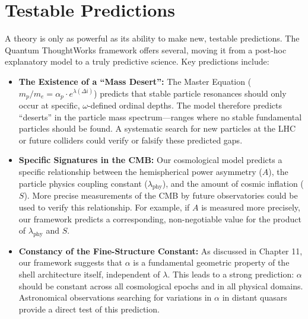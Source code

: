 \documentclass[12pt]{report}
\begin{document}
\section{Testable Predictions}
A theory is only as powerful as its ability to make new, testable predictions. The Quantum ThoughtWorks framework offers several, moving it from a post-hoc explanatory model to a truly predictive science. Key predictions include:
\begin{itemize}
    \item \textbf{The Existence of a ``Mass Desert'':} The Master Equation ($m_p/m_e = \alpha_p \cdot e^{\lambda (\Delta i)}$) predicts that stable particle resonances should only occur at specific, $\omega$-defined ordinal depths. The model therefore predicts ``deserts'' in the particle mass spectrum---ranges where no stable fundamental particles should be found. A systematic search for new particles at the LHC or future colliders could verify or falsify these predicted gaps.
    \item \textbf{Specific Signatures in the CMB:} Our cosmological model predicts a specific relationship between the hemispherical power asymmetry ($A$), the particle physics coupling constant ($\lambda_{\text{phy}}$), and the amount of cosmic inflation ($S$). More precise measurements of the CMB by future observatories could be used to verify this relationship. For example, if $A$ is measured more precisely, our framework predicts a corresponding, non-negotiable value for the product of $\lambda_{\text{phy}}$ and $S$.
    \item \textbf{Constancy of the Fine-Structure Constant:} As discussed in Chapter 11, our framework suggests that $\alpha$ is a fundamental geometric property of the shell architecture itself, independent of $\lambda$. This leads to a strong prediction: $\alpha$ should be constant across all cosmological epochs and in all physical domains. Astronomical observations searching for variations in $\alpha$ in distant quasars provide a direct test of this prediction.
\end{itemize}
\end{document}
